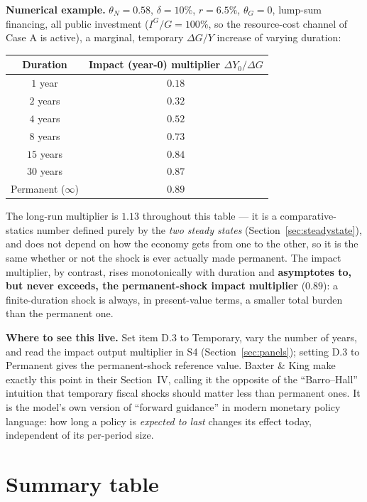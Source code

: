 \documentclass[11pt]{article}
\begin{document}
\begin{casebox}
\textbf{Numerical example.} $\theta_N=0.58$, $\delta=10\%$, $r=6.5\%$,
$\theta_G=0$, lump-sum financing, all public investment ($I^G/G=100\%$,
so the resource-cost channel of Case A is active), a marginal, temporary
$\Delta G/Y$ increase of varying duration:
\begin{center}
\begin{tabular}{cc}
\toprule
Duration & Impact (year-0) multiplier $\Delta Y_0/\Delta G$ \\
\midrule
$1$ year & $0.18$ \\
$2$ years & $0.32$ \\
$4$ years & $0.52$ \\
$8$ years & $0.73$ \\
$15$ years & $0.84$ \\
$30$ years & $0.87$ \\
Permanent ($\infty$) & $0.89$ \\
\bottomrule
\end{tabular}
\end{center}
The long-run multiplier is $1.13$ throughout this table --- it is a
comparative-statics number defined purely by the \emph{two steady
states} (Section~\ref{sec:steadystate}), and does not depend on how the
economy gets from one to the other, so it is the same whether or not the
shock is ever actually made permanent. The impact multiplier, by
contrast, rises monotonically with duration and \textbf{asymptotes to,
but never exceeds, the permanent-shock impact multiplier} ($0.89$): a
finite-duration shock is always, in present-value terms, a smaller
total burden than the permanent one.
\end{casebox}

\begin{notebox}
\textbf{Where to see this live.} Set item D.3 to Temporary, vary the
number of years, and read the impact output multiplier in S4
(Section~\ref{sec:panels}); setting D.3 to Permanent gives the
permanent-shock reference value. Baxter \& King make exactly this point in their
Section~IV, calling it the opposite of the ``Barro--Hall'' intuition that
temporary fiscal shocks should matter less than permanent ones. It is
the model's own version of ``forward guidance'' in modern monetary
policy language: how long a policy is \emph{expected to last} changes
its effect today, independent of its per-period size.
\end{notebox}

\section{Summary table}
\end{document}
